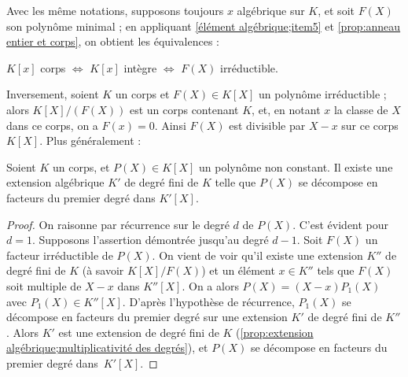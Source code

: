 \documentclass[11pt, %
  title in boldface,
  theorem in new line,
  theorem numbering = section,
  number theorems separately,
  simple name,
]{beaulivre}
\begin{document}
    Avec les même notations, supposons toujours \( x \) algébrique sur \( K \), et soit \( F(X) \) son polynôme minimal ; en appliquant \ref{élément algébrique;item5} et \cref{prop:anneau entier et corps}, on obtient les équivalences :
    \begin{enumerate-Roman}[resume]\itshape
        \item \( K[x] \) corps \( \iff \) \( K[x] \) intègre \( \iff \) \( F(X) \) irréductible.
    \end{enumerate-Roman}
    Inversement, soient \( K \) un corps et \( F(X) \in K[X] \) un polynôme irréductible ; alors \( K[X]/(F(X)) \) est un corps contenant \( K \), et, en notant \( x \) la classe de \( X \) dans ce corps, on a \( F(x) = 0 \). Ainsi \( F(X) \) est divisible par \( X-x \) sur ce corps \( K[X] \). Plus généralement :
    \begin{proposition}\label{prop:existence d'une extension algébrique telle que le polynôme se décompose}
        Soient \( K \) un corps, et \( P(X) \in K[X] \) un polynôme non constant. Il existe une extension algébrique \( K' \) de degré fini de \( K \) telle que \( P(X) \) se décompose en facteurs du premier degré dans \( K'[X] \).
    \end{proposition}
    \begin{proof}
        On raisonne par récurrence sur le degré \( d \) de \( P(X) \). C'est évident pour \( d = 1 \). Supposons l'assertion démontrée jusqu'au degré \( d-1 \). Soit \( F(X) \) un facteur irréductible de \( P(X) \). On vient de voir qu'il existe une extension \( K'' \) de degré fini de \( K \) (à savoir \( K[X]/F(X) \)) et un élément \( x \in K'' \) tels que \( F(X) \) soit multiple de \( X-x \) dans \( K''[X] \). On a alors \( P(X) = (X-x)P_1(X) \) avec \( P_1(X) \in K''[X] \). D'après l'hypothèse de récurrence, \( P_1(X) \) se décompose en facteurs du premier degré sur une extension \( K' \) de degré fini de \( K'' \). Alors \( K' \) est une extension de degré fini de \( K \) (\cref{prop:extension algébrique;multiplicativité des degrés}), et \( P(X) \) se décompose en facteurs du premier degré dans~\( K'[X] \).
    \end{proof}
\end{document}
